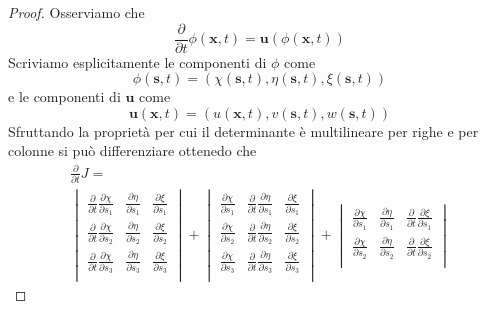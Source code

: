 \begin{proof}
Osserviamo che 
\begin{equation}
\frac{\partial}{\partial t}\phi(\mathbf{x},t) = \mathbf{u}(\phi(\mathbf{x},t))
\end{equation}
Scriviamo esplicitamente le componenti di $\phi$ come
\begin{equation*}
\phi(\mathbf{s},t)=(\chi(\mathbf{s},t),\eta(\mathbf{s},t),\xi(\mathbf{s},t))
\end{equation*}
e le componenti di $\mathbf{u}$ come
\begin{equation*}
\mathbf{u}(\mathbf{x},t)=(u(\mathbf{x},t),v(\mathbf{s},t),w(\mathbf{s},t))
\end{equation*}
Sfruttando la proprietà per cui il determinante è multilineare per righe e per colonne si può differenziare ottenedo che
\begin{multline*}
\frac{\partial}{\partial t}J = \\
\begin{vmatrix}
\frac{\partial}{\partial t}\frac{\partial \chi}{\partial s_1} & \frac{\partial \eta}{\partial s_1} & \frac{\partial \xi}{\partial s_1} \\
\frac{\partial}{\partial t}\frac{\partial \chi}{\partial s_2} & \frac{\partial \eta}{\partial s_2} & \frac{\partial \xi}{\partial s_2} \\
\frac{\partial}{\partial t}\frac{\partial \chi}{\partial s_3} & \frac{\partial \eta}{\partial s_3} & \frac{\partial \xi}{\partial s_3} \\
\end{vmatrix}
+
\begin{vmatrix}
\frac{\partial \chi}{\partial s_1} & \frac{\partial}{\partial t}\frac{\partial \eta}{\partial s_1} & \frac{\partial \xi}{\partial s_1} \\
\frac{\partial \chi}{\partial s_2} & \frac{\partial}{\partial t}\frac{\partial \eta}{\partial s_2} & \frac{\partial \xi}{\partial s_2} \\
\frac{\partial \chi}{\partial s_3} & \frac{\partial}{\partial t}\frac{\partial \eta}{\partial s_3} & \frac{\partial \xi}{\partial s_3} \\
\end{vmatrix}
+
\begin{vmatrix}
\frac{\partial \chi}{\partial s_1} & \frac{\partial \eta}{\partial s_1} & \frac{\partial}{\partial t}\frac{\partial \xi}{\partial s_1} \\
\frac{\partial \chi}{\partial s_2} & \frac{\partial \eta}{\partial s_2} & \frac{\partial}{\partial t}\frac{\partial \xi}{\partial s_2} \\

\end{vmatrix}
\end{multline*}
\end{proof}
